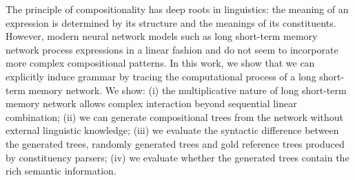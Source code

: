 The principle of compositionality has deep roots in linguistics: the meaning of an expression is determined by its structure and the meanings of its constituents. However, modern neural network models such as long short-term memory network process expressions in a linear fashion and do not seem to incorporate more complex compositional patterns. In this work, we show that we can explicitly induce grammar by tracing the computational process of a long short-term memory network. We show: (i) the multiplicative nature of long short-term memory network allows complex interaction beyond sequential linear combination; (ii) we can generate compositional trees from the network without external linguistic knowledge; (iii) we evaluate the syntactic difference between the generated trees, randomly generated trees and gold reference trees produced by constituency parsers; (iv) we evaluate whether the generated trees contain the rich semantic information.
